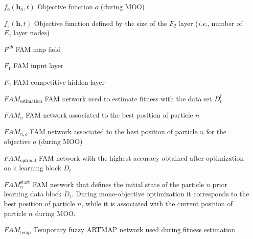 \documentclass[letterpaper, twoside, 12pt, memoire, creativecommons, hyperref]{thETS}
\begin{document}
\begin{listofsymbols}[3cm]
\item [$f_o(\textbf{h}_n,t)$] Objective function $o$ (during MOO)
\item [$f_s(\mathbf{h},t)$] Objective function defined by the size of the $F_2$ layer (\emph{i.e.}, number of $F_2$ layer nodes)
\item [$F^{ab}$] FAM map field
\item [$F_1$] FAM input layer
\item [$F_2$] FAM competitive hidden layer
\item [$\textit{FAM}_\text{estimation}$] FAM network used to estimate fitness with the data set $D_t^\text{f}$
\item [$\textit{FAM}_n$] FAM network associated to the best position of particle $n$
\item [$\textit{FAM}_{n,o}$] FAM network associated to the best position of particle $n$ for the objective $o$ (during MOO)
\item [$\textit{FAM}_\text{optimal}$] FAM network with the highest accuracy obtained after optimization on a learning block $D_t$
\item [$\textit{FAM}_n^\text{start}$] FAM network that defines the initial state of the particle $n$ prior learning data block $D_t$. During mono-objective optimization it corresponds to the best position of particle $n$, while it is associated with the current position of particle $n$ during MOO.
\item [$\textit{FAM}_\text{temp}$] Temporary fuzzy ARTMAP network used during fitness estimation

\end{listofsymbols}

\cleardoublepage


\reversemarginpar %
\end{document}
